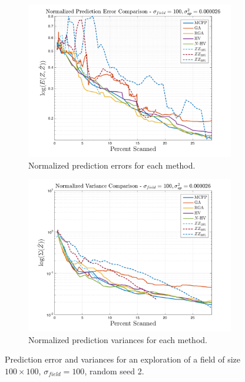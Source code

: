 \begin{figure}[htb!]
    \centering
    \begin{subfigure}[t]{0.50\textwidth}
        \centering
        \includegraphics[width=\linewidth]{figures/results/normalized_errors_30p_100x100_sf_100_seed_2_app_50.png}
        \ssp
        \captionsetup{skip=0.20\baselineskip,size=footnotesize}
        \caption{Normalized prediction errors for each method.}
    \end{subfigure}%
    \begin{subfigure}[t]{0.50\textwidth}
        \centering
        \includegraphics[width=\linewidth]{figures/results/normalized_variances_30p_100x100_sf_100_seed_2_app_50.png}
        \ssp
        \captionsetup{skip=0.20\baselineskip,size=footnotesize}
        \caption{Normalized prediction variances for each method.}
    \end{subfigure}%
    \ssp
    \captionsetup{skip=0.20\baselineskip}
    \caption{Prediction error and variances for an exploration of a field of size $100 \times 100$, $\sigma_{field} = 100$, random seed 2.}
    \label{fig:errvar100}
\end{figure}

